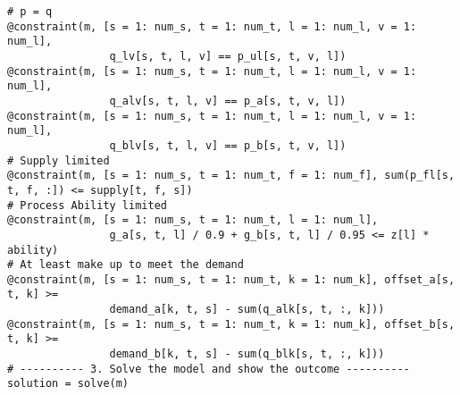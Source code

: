 \documentclass[fleqn,10pt]{wlscirep}
\begin{document}
\begin{lstlisting}
# p = q
@constraint(m, [s = 1: num_s, t = 1: num_t, l = 1: num_l, v = 1: num_l],
                q_lv[s, t, l, v] == p_ul[s, t, v, l])
@constraint(m, [s = 1: num_s, t = 1: num_t, l = 1: num_l, v = 1: num_l],
                q_alv[s, t, l, v] == p_a[s, t, v, l])
@constraint(m, [s = 1: num_s, t = 1: num_t, l = 1: num_l, v = 1: num_l],
                q_blv[s, t, l, v] == p_b[s, t, v, l])
# Supply limited
@constraint(m, [s = 1: num_s, t = 1: num_t, f = 1: num_f], sum(p_fl[s, t, f, :]) <= supply[t, f, s])
# Process Ability limited
@constraint(m, [s = 1: num_s, t = 1: num_t, l = 1: num_l],
                g_a[s, t, l] / 0.9 + g_b[s, t, l] / 0.95 <= z[l] * ability)
# At least make up to meet the demand
@constraint(m, [s = 1: num_s, t = 1: num_t, k = 1: num_k], offset_a[s, t, k] >=
                demand_a[k, t, s] - sum(q_alk[s, t, :, k]))
@constraint(m, [s = 1: num_s, t = 1: num_t, k = 1: num_k], offset_b[s, t, k] >=
                demand_b[k, t, s] - sum(q_blk[s, t, :, k]))
# ---------- 3. Solve the model and show the outcome ----------
solution = solve(m)
\end{lstlisting}
\end{document}
